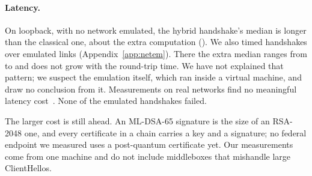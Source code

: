 \paragraph{Latency.} On loopback, with no network emulated, the hybrid
handshake's median is  longer than the classical
one, about the extra computation (). We also
timed handshakes over emulated links (Appendix~\ref{app:netem}). There the
extra median ranges from  to
 and does not grow with the round-trip time. We
have not explained that pattern; we suspect the emulation itself, which ran
inside a virtual machine, and draw no conclusion from it. Measurements on real
networks find no meaningful latency cost~\cite{wickramasinghe2026,kampanakis2024}.
None of the  emulated handshakes failed.

The larger cost is still ahead. An ML-DSA-65 signature is
 the size of an RSA-2048 one, and every
certificate in a chain carries a key and a signature; no federal endpoint we
measured uses a post-quantum certificate yet. Our measurements come from one
machine and do not include middleboxes that mishandle large ClientHellos.
